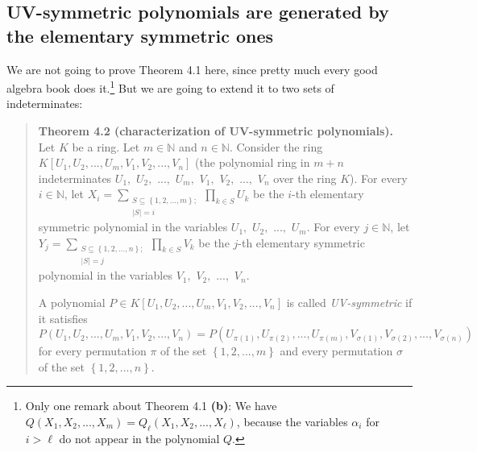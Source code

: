 \documentclass[numbers=enddot,12pt,final,onecolumn,notitlepage]{scrartcl}%
\begin{document}
\subsection{UV-symmetric polynomials are generated by the elementary symmetric
ones}

We are not going to prove Theorem 4.1 here, since pretty much every good
algebra book does it.\footnote{Only one remark about Theorem 4.1 \textbf{(b)}:
We have $Q\left(  X_{1},X_{2},...,X_{m}\right)  =Q_{\ell}\left(  X_{1}%
,X_{2},...,X_{\ell}\right)  $, because the variables $\alpha_{i}$ for $i>\ell$
do not appear in the polynomial $Q$.} But we are going to extend it to two
sets of indeterminates:

\begin{quote}
\textbf{Theorem 4.2 (characterization of UV-symmetric polynomials).} Let $K$
be a ring. Let $m\in\mathbb{N}$ and $n\in\mathbb{N}$. Consider the ring
$K\left[  U_{1},U_{2},...,U_{m},V_{1},V_{2},...,V_{n}\right]  $ (the
polynomial ring in $m+n$ indeterminates $U_{1},$ $U_{2},$ $...,$ $U_{m},$
$V_{1},$ $V_{2},$ $...,$ $V_{n}$ over the ring $K$). For every $i\in
\mathbb{N}$, let $X_{i}=\sum\limits_{\substack{S\subseteq\left\{
1,2,...,m\right\}  ;\\\left\vert S\right\vert =i}}\prod\limits_{k\in S}U_{k}$
be the $i$-th elementary symmetric polynomial in the variables $U_{1},$
$U_{2},$ $...,$ $U_{m}$. For every $j\in\mathbb{N}$, let $Y_{j}=\sum
\limits_{\substack{S\subseteq\left\{  1,2,...,n\right\}  ;\\\left\vert
S\right\vert =j}}\prod\limits_{k\in S}V_{k}$ be the $j$-th elementary
symmetric polynomial in the variables $V_{1},$ $V_{2},$ $...,$ $V_{n}$.

A polynomial $P\in K\left[  U_{1},U_{2},...,U_{m},V_{1},V_{2},...,V_{n}%
\right]  $ is called \textit{UV-symmetric} if it satisfies%
\[
P\left(  U_{1},U_{2},...,U_{m},V_{1},V_{2},...,V_{n}\right)  =P\left(
U_{\pi\left(  1\right)  },U_{\pi\left(  2\right)  },...,U_{\pi\left(
m\right)  },V_{\sigma\left(  1\right)  },V_{\sigma\left(  2\right)
},...,V_{\sigma\left(  n\right)  }\right)
\]
for every permutation $\pi$ of the set $\left\{  1,2,...,m\right\}  $ and
every permutation $\sigma$ of the set $\left\{  1,2,...,n\right\}  $.


\end{quote}
\end{document}
